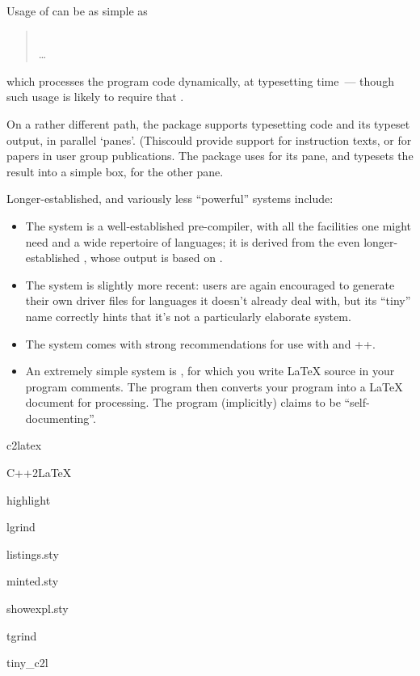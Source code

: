 Usage of  can be as simple as
\begin{quote}
  \\
  \dots{}\\
\end{quote}
which processes the program code dynamically, at typesetting time~---
though such usage is likely to require that %
.

On a rather different path, the package  supports
typesetting \alltex{} code and its typeset output, in parallel
`panes'.  (Thiscould provide support for \alltex{} instruction texts,
or for papers in \tex{} user group publications.  The package uses
 for its \alltex{} pane, and typesets the result
into a simple box, for the other pane.

Longer-established, and variously less ``powerful'' systems include:
\begin{itemize}
\item The  system is a well-established
  pre-compiler, with all the facilities one might need and a wide
  repertoire of languages; it is derived from the even
  longer-established , whose output is based on
  \plaintex{}.
\item The  system is slightly more recent: users
  are again encouraged to generate their own driver files for
  languages it doesn't already deal with, but its ``tiny'' name
  correctly hints that it's not a particularly elaborate system.
\item The  system comes with strong
  recommendations for use with  and ++.
\item An extremely simple system is , for which you
  write \LaTeX{} source in your  program comments.  The
  program then converts your program into a \LaTeX{} document for
  processing.  The program (implicitly) claims to be
  ``self-documenting''.
\end{itemize}
\begin{ctanrefs}
\item[c2latex]
\item[C++2LaTeX]
\item[highlight]
\item[lgrind]
\item[listings.sty]
\item[minted.sty]
\item[showexpl.sty]
\item[tgrind]
\item[tiny\_c2l]
\end{ctanrefs}

